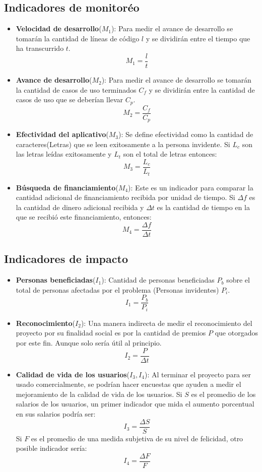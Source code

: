 \documentclass[a4paper, 12pt, oneside]{article}
\begin{document}
	\subsection{Indicadores de monitoréo}
	\begin{itemize}
		\item {\bf Velocidad de desarrollo}($M_1$): Para medir el avance de desarrollo se tomarán la cantidad
			de líneas de código $l$ y se dividirán entre el tiempo que ha transcurrido $t$.
			\[M_1 = \frac{l}{t}\]
		\item {\bf Avance de desarrollo}($M_2$): Para medir el avance de desarrollo se tomarán la cantidad
			de casos de uso terminados $C_f$ y se dividirán entre la cantidad de casos de uso que se deberían
			llevar $C_p$.
			\[M_2 = \frac{C_f}{C_p}\]
		\item {\bf Efectividad del aplicativo}($M_3$): Se define efectividad como la cantidad de caracteres(Letras)
			que se leen exitosamente a la persona invidente. Si $L_c$ son las letras leídas exitosamente y $L_t$
			son el total de letras entonces:
			\[M_3 = \frac{L_c}{L_t}\]	
		\item {\bf Búsqueda de financiamiento}($M_4$): Este es un indicador para comparar la cantidad adicional de
			financiamiento recibida por unidad de tiempo. Si $\Delta f$ es la cantidad de dinero adicional recibida
			y $\Delta t$ es la cantidad de tiempo en la que se recibió este financiamiento, entonces:
			\[M_4 = \frac{\Delta f}{\Delta t}\]
	\end{itemize}
	
	\subsection{Indicadores de impacto}
	\begin{itemize}
		\item {\bf Personas beneficiadas}($I_1$): Cantidad de personas beneficiadas $P_b$ sobre el total
			de personas afectadas por el problema (Personas invidentes) $P_i$.
			\[I_1 = \frac{P_b}{P_i}\]
		\item {\bf Reconocimiento}($I_2$): Una manera indirecta de medir el reconocimiento del proyecto por su
		 finalidad social es por la cantidad de premios $P$ que otorgados por este fin. Aunque solo sería útil
		 al principio.
			\[I_2 = \frac{P}{\Delta t}\]
		\item {\bf Calidad de vida de los usuarios}($I_3,I_4$): Al terminar el proyecto para ser usado comercialmente,
			se podrían hacer encuestas que ayuden a medir el mejoramiento de la calidad de vida de los usuarios.
			Si $S$ es el promedio de los salarios de los usuarios, un primer indicador que mida el aumento porcentual
			en sus salarios podría ser:
			\[I_3 = \frac{\Delta S}{S}\]
			Si $F$ es el promedio de una medida subjetiva de su nivel de felicidad, otro posible indicador sería:
			\[I_4 = \frac{\Delta F}{F}\]
	\end{itemize}
	
\end{document}
